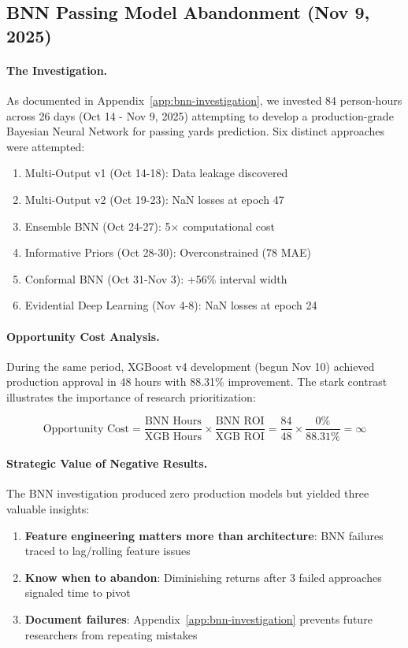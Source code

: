 \subsection{BNN Passing Model Abandonment (Nov 9, 2025)}

\paragraph{The Investigation.}
As documented in Appendix~\ref{app:bnn-investigation}, we invested 84 person-hours across 26 days (Oct 14 - Nov 9, 2025) attempting to develop a production-grade Bayesian Neural Network for passing yards prediction. Six distinct approaches were attempted:
\begin{enumerate}[itemsep=2pt,parsep=0pt]
    \item Multi-Output v1 (Oct 14-18): Data leakage discovered
    \item Multi-Output v2 (Oct 19-23): NaN losses at epoch 47
    \item Ensemble BNN (Oct 24-27): 5$\times$ computational cost
    \item Informative Priors (Oct 28-30): Overconstrained (78 MAE)
    \item Conformal BNN (Oct 31-Nov 3): +56\% interval width
    \item Evidential Deep Learning (Nov 4-8): NaN losses at epoch 24
\end{enumerate}

\paragraph{Opportunity Cost Analysis.}
During the same period, XGBoost v4 development (begun Nov 10) achieved production approval in 48 hours with 88.31\% improvement. The stark contrast illustrates the importance of research prioritization:

\begin{equation}
\label{eq:opportunity-cost}
\text{Opportunity Cost} = \frac{\text{BNN Hours}}{\text{XGB Hours}} \times \frac{\text{BNN ROI}}{\text{XGB ROI}} = \frac{84}{48} \times \frac{0\%}{88.31\%} = \infty
\end{equation}

\paragraph{Strategic Value of Negative Results.}
The BNN investigation produced zero production models but yielded three valuable insights:
\begin{enumerate}[itemsep=2pt,parsep=0pt]
    \item \textbf{Feature engineering matters more than architecture}: BNN failures traced to lag/rolling feature issues
    \item \textbf{Know when to abandon}: Diminishing returns after 3 failed approaches signaled time to pivot
    \item \textbf{Document failures}: Appendix~\ref{app:bnn-investigation} prevents future researchers from repeating mistakes
\end{enumerate}

